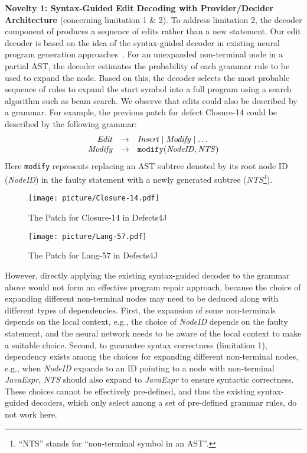 {\bf Novelty 1: Syntax-Guided Edit Decoding with Provider/Decider Architecture} (concerning limitation 1 \& 2).
To address limitation 2, the decoder component of \techname produces a sequence of edits rather than a new statement. Our edit decoder is based on the idea of the syntax-guided decoder in existing neural program generation approaches~\cite{treegen,DBLP:conf/acl/YinN17,DBLP:conf/acl/RabinovichSK17,DBLP:conf/aaai/SunZMXLZ19}. For an unexpanded non-terminal node in a partial AST, the decoder estimates the probability of each grammar rule to be used to expand the node. Based on this, the decoder selects the most probable sequence of rules to expand the start symbol into a full program using a search algorithm such as beam search. %
We observe that edits could also be described by a grammar. For example, the previous patch for defect Closure-14 could be described by the following grammar: 
\[\begin{array}{rcl}
    {\it Edit} &\rightarrow & {\it Insert} \mid {\it Modify} \mid \ldots \\
    {\it Modify} &\rightarrow & {\tt modify}({\it NodeID}, {\it NTS}) \\
\end{array}\]  
Here {\tt modify} represents replacing an AST subtree denoted by its root node ID ({\it NodeID}) in the faulty statement with a newly generated subtree ({\it NTS\footnote{``NTS'' stands for ``non-terminal symbol in an AST''.}}).
\begin{figure}
    \centering
    \texttt{[image: picture/Closure-14.pdf]}
    \vspace{-8mm}
    \caption{The Patch for Closure-14 in Defects4J }
    \vspace{-2mm}
    \label{fig:pattern-de1}
\end{figure}
\begin{figure}
    \centering
    \texttt{[image: picture/Lang-57.pdf]}
    \vspace{-8mm}
    \caption{The Patch for Lang-57 in Defects4J}
    \vspace{-2mm}
    \label{fig:pattern-de2}
\end{figure}

However, directly applying the existing syntax-guided decoder to the grammar above would not form an effective program repair approach, because the choice of expanding different non-terminal nodes may need to be deduced along with different types of dependencies.
First, the expansion of some non-terminals depends on the local context, e.g., the choice of {\it NodeID} depends on the faulty statement, and the neural network needs to be aware of the local context to make a suitable choice. 
Second, to guarantee syntax correctness (limitation 1), dependency exists among the choices for expanding different non-terminal nodes, e.g., when {\it NodeID} expands to an ID pointing to a node with non-terminal {\it JavaExpr}, {\it NTS} should also expand to {\it JavaExpr} to ensure syntactic correctness. These choices cannot be effectively pre-defined, and thus the existing syntax-guided decoders, which only select among a set of pre-defined grammar rules, do not work here. 

